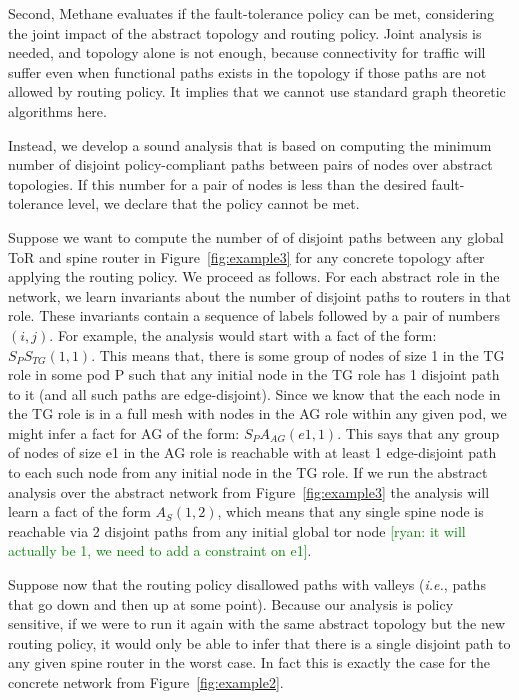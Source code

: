 \documentclass[numbers, 10pt, preprint]{sigplanconf}
\newcommand{\ryan}[1]{\textcolor{green}{[ryan: #1]}}
\newcommand{\IE}{\emph{i.e.}}
\newcommand{\sysname}{{\small \sf Methane}\xspace}
\newcommand{\CD}[1]{\texttt{\small #1}}  %
\newcommand{\KW}[1]{\texttt{\small\bfseries{#1}}}
\newcommand{\True}{\CD{true}}
\newcommand{\Define}{\KW{define}}
\newcommand{\Path}{\texttt{=>}}
\newcommand{\Novalley}{\KW{novalley}}
\begin{document}
Second, \sysname evaluates if the fault-tolerance policy can be met, considering the joint impact of the abstract topology and routing policy. Joint analysis is needed, and topology alone is not enough, because connectivity for traffic will suffer even when functional paths exists in the topology if those paths are not allowed by routing policy. It implies that we cannot use standard graph theoretic algorithms here. 

Instead, we develop a sound analysis that is based on computing the minimum number of disjoint policy-compliant paths between pairs of nodes over abstract topologies. If this number for a pair of nodes is less than the desired fault-tolerance level, we declare that the policy cannot be met. 

Suppose we want to compute the number of of disjoint paths between any global ToR and spine router in Figure~\ref{fig:example3} for any concrete topology after applying the routing policy.
We proceed as follows. For each abstract role in the network, we learn invariants about the number of disjoint paths to routers in that role. These invariants contain a sequence of labels followed by a pair of numbers $(i,j)$. For example, the analysis would start with a fact of the form: $S_P S_{TG} (1,1)$. This means that, there is some group of nodes of size 1 in the TG role in some pod P such that any initial node in the TG role has 1 disjoint path to it (and all such paths are edge-disjoint). Since we know that the each node in the TG role is in a full mesh with nodes in the AG role within any given pod, we might infer a fact for AG of the form: $S_P A_{AG}(e1,1)$. This says that any group of nodes of size e1 in the AG role is reachable with at least 1 edge-disjoint path to each such node from any initial node in the TG role.
%
If we run the abstract analysis over the abstract network from Figure~\ref{fig:example3} the analysis will learn a fact of the form $A_{S}(1,2)$, which means that any single spine node is reachable via 2 disjoint paths from any initial global tor node \ryan{it will actually be 1, we need to add a constraint on e1}.

Suppose now that the routing policy disallowed paths with valleys (\IE, paths that go down and then up at some point). 
Because our analysis is policy sensitive, if we were to run it again with the same abstract topology but the new routing policy, it would only be able to infer that there is a single disjoint path to any given spine router in the worst case. 
In fact this is exactly the case for the concrete network from Figure~\ref{fig:example2}.
\end{document}
